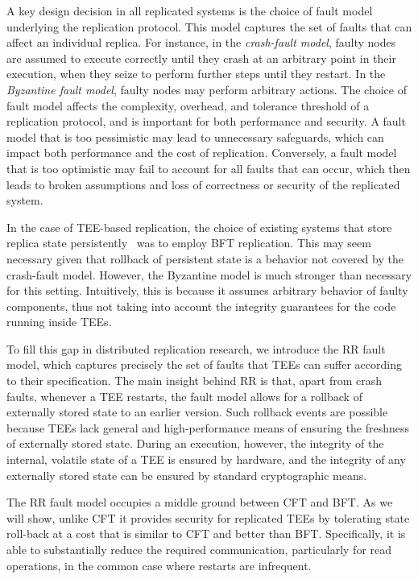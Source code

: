 A key design decision in all replicated systems is the choice of fault
model underlying the replication protocol. This model captures the set
of faults that can affect an individual replica.  For instance, in the
{\em crash-fault model}, faulty nodes are assumed to execute correctly
until they crash at an arbitrary point in their execution, when they
seize to perform further steps until they restart. In the {\em
  Byzantine fault model}, faulty nodes may perform arbitrary
actions. The choice of fault model affects the complexity, overhead,
and tolerance threshold of a replication protocol, and is important
for both performance and security. A fault model that is too
pessimistic may lead to unnecessary safeguards, which can impact both
performance and the cost of replication. Conversely, a fault model
that is too optimistic may fail to account for all faults that can
occur, which then leads to broken assumptions and loss of correctness
or security of the replicated system.

In the case of \ac{TEE}-based replication, the choice of existing systems
that store replica state persistently~\cite{teechain,rote} was to
employ \ac{BFT} replication. This may seem
necessary given that rollback of persistent state is a behavior not
covered by the crash-fault model.  However, the Byzantine model is
much stronger than necessary for this setting. Intuitively, this
is because it assumes arbitrary behavior of
faulty components, thus not taking into account the integrity
guarantees for the code running inside \acp{TEE}.

To fill this gap in distributed replication research, we
introduce the \ac{RR} fault model, which
captures precisely the set of faults that \acp{TEE} can suffer according to
their specification.  The main insight behind \ac{RR} is that,
apart from crash faults, whenever a \ac{TEE} restarts, the fault model
allows for a rollback of externally stored state to an earlier
version.  Such rollback events are possible because \acp{TEE} lack general
and high-performance means of ensuring the freshness of externally
stored state.  During an execution, however, the integrity of the
internal, volatile state of a \ac{TEE} is ensured by hardware, and the
integrity of any externally stored state can be ensured by standard
cryptographic means.

The \ac{RR} fault model occupies a middle ground between \ac{CFT}
and \ac{BFT}. As we will show, unlike CFT it provides
security for replicated \acp{TEE} by tolerating state roll-back at a cost
that is similar to \ac{CFT} and better than \ac{BFT}. Specifically, it is able
to substantially reduce the required communication, particularly for
read operations, in the common case where restarts are
infrequent.

